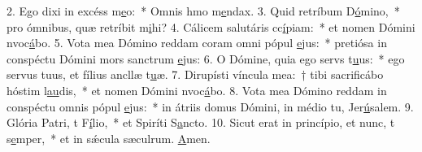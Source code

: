 2. Ego dixi in excéss m\uline{e}o:~* Omnis hmo m\uline{e}ndax.
3. Quid retríbum D\uline{ó}mino,~* pro ómnibus, quæ retríbit m\uline{i}hi?
4. Cálicem salutáris cc\uline{í}piam:~* et nomen Dómini nvoc\uline{á}bo.
5. Vota mea Dómino reddam coram omni pópul \uline{e}jus:~* pretiósa in conspéctu Dómini mors sanctrum \uline{e}jus:
6. O Dómine, quia ego servs t\uline{u}us:~* ego servus tuus, et fílius ancllæ t\uline{u}æ.
7. Dirupísti víncula mea:~† tibi sacrificábo hóstim l\uline{au}dis,~* et nomen Dómini nvoc\uline{á}bo.
8. Vota mea Dómino reddam in conspéctu omnis pópul \uline{e}jus:~* in átriis domus Dómini, in médio tu, Jer\uline{ú}salem.
9. Glória Patri, t F\uline{í}lio,~* et Spiríti S\uline{a}ncto.
10. Sicut erat in princípio, et nunc, t s\uline{e}mper,~* et in sǽcula sæculrum. \uline{A}men.
